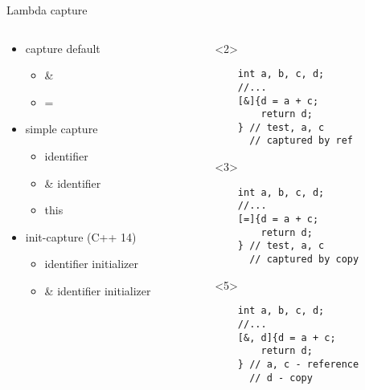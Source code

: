\documentclass[10pt]{beamer}
\begin{document}
\begin{frame}[fragile]{Lambda capture}

	\begin{columns}
		\begin{column}{0.37\linewidth}
		\begin{itemize}[<+- |alert@+>]
		\item capture default
			\begin{itemize}
				\item \&
				\item =
			\end{itemize}
		\item simple capture
			\begin{itemize}
				\item identifier
				\item \& identifier
				\item this
			\end{itemize}
		\item init-capture \footnotesize (C++ 14)
			\begin{itemize}
				\item identifier initializer
				\item \& identifier initializer
			\end{itemize}	
	\end{itemize}
		\end{column}
		\vrule
		\begin{column}{0.6\linewidth}
			\begin{onlyenv}<2>
				\begin{verbatim}
    int a, b, c, d;
    //...
    [&]{d = a + c;
        return d;
    } // test, a, c
      // captured by ref 
				\end{verbatim}
			\end{onlyenv}
			\begin{onlyenv}<3>
				\begin{verbatim}
    int a, b, c, d;
    //...
    [=]{d = a + c;
        return d;
    } // test, a, c
      // captured by copy 
				\end{verbatim}
			\end{onlyenv}
			\begin{onlyenv}<5>
				\begin{verbatim}
    int a, b, c, d;
    //...
    [&, d]{d = a + c;
        return d;
    } // a, c - reference
      // d - copy 
				\end{verbatim}
			\end{onlyenv}

\end{column}
\end{columns}
\end{frame}
\end{document}
